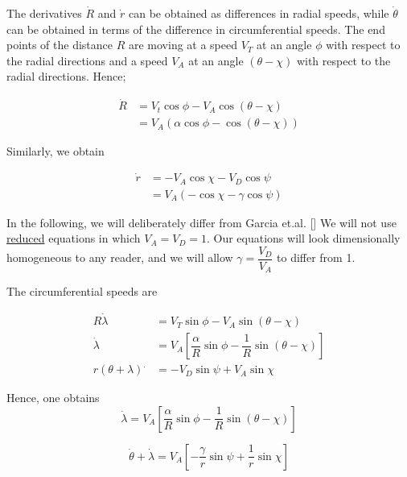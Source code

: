 The derivatives $\dot{R}$ and $\dot{r}$ can be obtained as differences in radial speeds, while $\dot{\theta}$ can be obtained in terms of the difference in circumferential speeds. The end points of the distance $R$ are moving at a speed $V_T$ at an angle $\phi$ with respect to the radial directions and a speed $V_A$ at an angle $(\theta - \chi)$ with respect to the radial directions. Hence;

\begin{equation}
\begin{split}
\dot{R} &= V_t \cos \phi - V_A \cos(\theta - \chi)\\
&= V_A (\alpha \cos \phi - \cos(\theta - \chi))
\end{split}
\label{Rdot}
\end{equation}

Similarly, we obtain 

\begin{equation}
\begin{split}
\dot{r} &= -V_A \cos \chi - V_D \cos\psi\\
&= V_A (- \cos \chi - \gamma\cos\psi)
\end{split}
\label{rdot}
\end{equation}

In the following, we will deliberately differ from Garcia et.al. []
We will not use \underline{reduced} equations in which $V_A = V_D = 1$.
Our equations will look dimensionally homogeneous to any reader, and we will allow $\gamma = \dfrac{V_D}{V_A}$ to differ from 1.

The circumferential speeds are

\begin{equation*}
\begin{split}
R \dot{\lambda}& = V_T \sin \phi - V_A \sin (\theta - \chi)\\
\dot{\lambda} &= V_A [\dfrac{\alpha}{R} \sin \phi - \dfrac{1}{R} \sin (\theta - \chi)]\\
r (\theta + \lambda)^. &= - V_D \sin \psi + V_A \sin \chi
\end{split}
\end{equation*}  

Hence, one obtains 
\begin{equation}
\dot{\lambda} = V_A [\dfrac{\alpha}{R} \sin \phi - \dfrac{1}{R} \sin (\theta - \chi)]
\label{lambda dot}
\end{equation}

\begin{equation}
\dot{\theta} + \dot{\lambda} = V_A [-\dfrac{\gamma}{r}\sin \psi + \dfrac{1}{r} \sin \chi]
\label{theta+lambda dot}
\end{equation}

